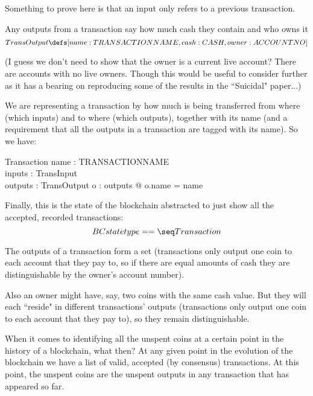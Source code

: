\documentclass[11pt]{amsart}
\begin{document}
Something to prove here is that an input only refers to a previous transaction.

Any outputs from a transaction say how much cash they contain and who owns it
\[
  TransOutput \defs [name : TRANSACTIONNAME, cash : CASH, owner : ACCOUNTNO]
 \]
 
(I guess we don't need to show that the owner is a current live account? There are accounts with no live owners. Though this would be useful to consider further as it has a bearing on reproducing some of the results in the ``Suicidal" paper...)
                       
 We are representing a transaction by how much is being transferred from where (which inputs)
 and to where (which outputs), together with its name (and a requirement that all the outputs in a transaction are tagged with its name). So we have:
 
\begin{schema}{Transaction}
name : TRANSACTIONNAME\\
inputs : \power TransInput\\
outputs : \power TransOutput
\where
\forall o : outputs @ o.name = name
\end{schema}

Finally, this is the state of the blockchain abstracted to just show all the accepted, recorded transactions:
 \[
  BCstatetype == \seq Transaction
\]

 The outputs of a transaction form a set (transactions only output one coin to each account that they pay to, so if there are equal amounts of cash they are distinguishable by the owner's account number).
 
 Also an owner might have, say, two coins with the same cash value. But they will each ``reside" in different transactions' outputs (transactions only output one coin to each account that they pay to), so they remain distinguishable. 
 
 
When it comes to identifying all the unspent coins at a certain point in the history of a blockchain, what then? At any given point in the evolution of the blockchain we have a list of valid, accepted (by consensus) transactions. At this point, the unspent coins are the unspent outputs in any transaction that has appeared so far. 
 
\end{document}

